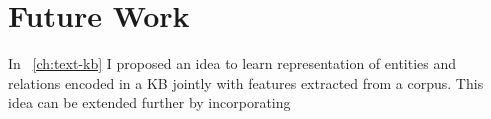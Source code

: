 \chapter{Future Work}
In ~\autoref{ch:text-kb} I proposed an idea to learn representation of entities
and relations encoded in a KB jointly with features extracted from a corpus.
This idea can be extended further by incorporating 
